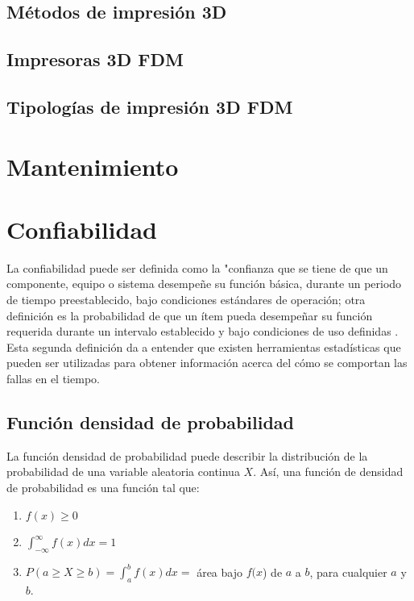 \subsection{Métodos de impresión 3D}

\subsection{Impresoras 3D FDM}

\subsection{Tipologías de impresión 3D FDM}

\section{Mantenimiento}

\section{Confiabilidad}

La confiabilidad puede ser definida como la "confianza que se tiene de que un componente, equipo o sistema desempeñe su función básica, durante un periodo de tiempo preestablecido, bajo condiciones estándares de operación; otra definición es la probabilidad de que un ítem pueda desempeñar su función requerida durante un intervalo establecido y bajo condiciones de uso definidas \citep{dairo2016}. Esta segunda definición da a entender que existen herramientas estadísticas que pueden ser utilizadas para obtener información acerca del cómo se comportan las fallas en el tiempo.

\subsection{Función densidad de probabilidad}

La función densidad de probabilidad puede describir la distribución de la probabilidad de una variable aleatoria continua $X$. Así, una función de densidad de probabilidad es una función tal que:

\begin{enumerate}
\item $f(x)\geqslant 0$
\item $\int_{-\infty}^{\infty}f(x)dx=1$
\item $P(a\geqslant X \geqslant b)=\int_{a}^{b}f(x)dx=$ área bajo $f(x$) de $a$ a $b$, para cualquier $a$ y $b$.
\end{enumerate}

